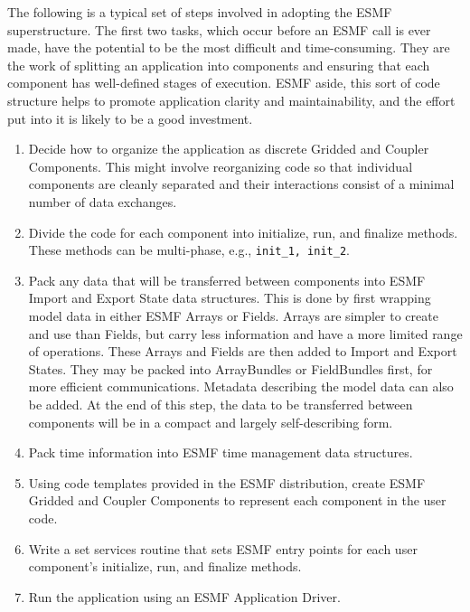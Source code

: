 The following is a typical set of steps involved in adopting
the ESMF superstructure.  The first two tasks, which occur 
before an ESMF call is ever made, have the potential to be 
the most difficult and time-consuming.  They are the work 
of splitting an application into components and ensuring that
each component has well-defined stages of execution.  ESMF
aside, this sort of code structure helps to promote application
clarity and maintainability, and the effort put into it is likely
to be a good investment.

\begin{enumerate}

\item Decide how to organize the application as discrete Gridded 
and Coupler Components.  This might involve reorganizing code
so that individual components are cleanly separated and their 
interactions consist of a minimal number of data exchanges.

\item Divide the code for each component into initialize, run, and
finalize methods.  These methods can be multi-phase, e.g., 
{\tt init\_1, init\_2}.

\item Pack any data that will be transferred between components
into ESMF Import and Export State data structures.  This is done
by first wrapping model data in either ESMF Arrays or Fields.
Arrays are simpler to create and use than Fields, but carry less
information and have a more limited range of operations.
These Arrays and Fields are then added to Import and
Export States.  They may be packed into ArrayBundles or
FieldBundles first, for more efficient communications.
Metadata describing the model data can also be added.
At the end of this step, the data to be transferred between
components will be in a compact and largely self-describing
form.

\item Pack time information into ESMF time management data 
structures.

\item Using code templates provided in the ESMF distribution, create
ESMF Gridded and Coupler Components to represent each component
in the user code.

\item Write a set services routine that sets ESMF entry 
points for each user component's initialize, run, and finalize 
methods.

\item Run the application using an ESMF Application Driver.

\end{enumerate} 

